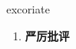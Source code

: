 
\begin{frame}
{\huge excoriate}
\begin{center}
\begin{enumerate}\Large
  \item \textbf{严厉批评}
\end{enumerate}
\end{center}
\end{frame}
